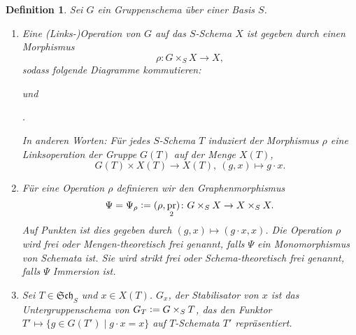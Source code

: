 \documentclass[DIV11,11pt]{scrartcl}
\theoremstyle{Definitionen}
\newtheorem{Def}{Definition}[section]
\theoremstyle{Aussagen}
\newcommand{\coloneq}{\ensuremath{\mathrel{\mathop{\raisebox{0.5pt}{:}}}=}}
\DeclareMathOperator{\id}{id}
\DeclareMathOperator{\pr}{pr}
\begin{document}
\begin{Def}
Sei $G$ ein Gruppenschema über einer Basis $S$.
\begin{enumerate}
\item Eine \textit{(Links-)Operation von $G$ auf das $S$-Schema $X$} ist gegeben durch einen Morphismus
\begin{displaymath}
\rho\colon G\times_S X\rightarrow X,
\end{displaymath}
sodass folgende Diagramme kommutieren:
\begin{center}\end{center}
und
\begin{center}.\end{center}
In anderen Worten: Für jedes $S$-Schema $T$ induziert der Morphismus $\rho$ eine Linksoperation der Gruppe $G(T)$ auf der Menge $X(T)$,
\begin{displaymath}
G(T)\times X(T)\rightarrow X(T),~(g,x)\mapsto g\cdot x.
\end{displaymath}
\item Für eine Operation $\rho$ definieren wir den \textit{Graphenmorphismus}
\begin{displaymath}
\Psi=\Psi_{\rho}\coloneq(\rho ,\pr_2)\colon G\times_S X\rightarrow X\times_S X.
\end{displaymath}
Auf Punkten ist dies gegeben durch $(g,x)\mapsto (g\cdot x,x)$. Die Operation $\rho$ wird \textit{frei} oder \textit{Mengen-theoretisch frei} genannt, falls $\Psi$ ein Monomorphismus von Schemata ist. Sie wird \textit{strikt frei} oder \textit{Schema-theoretisch frei} genannt, falls $\Psi$ Immersion ist.
\item Sei $T\in\mathfrak{Sch}_S$ und $x\in X(T)$. $G_x$, der \textit{Stabilisator von $x$} ist das Untergruppenschema von $G_T\coloneq G\times_S T$, das den Funktor $T'\mapsto\{g\in G(T')\mid g\cdot x=x\}$ auf $T$-Schemata $T'$ repräsentiert.
\end{enumerate}
\end{Def}
\end{document}
